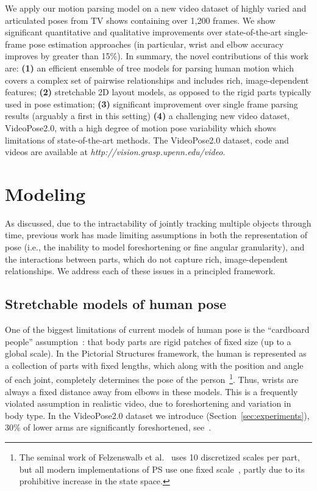 We apply our motion parsing model on a new video dataset of highly varied and 
articulated poses from TV shows containing over 1,200 frames.  We show 
significant quantitative and qualitative improvements over state-of-the-art 
single-frame pose estimation approaches (in particular, wrist and elbow 
accuracy improves by greater than 15\%).  In summary, the novel contributions 
of this work are: \textbf{(1)} an efficient ensemble of tree models for parsing 
human motion which covers a complex set of pairwise relationships and includes 
rich, image-dependent features; \textbf{(2)} stretchable 2D layout models, as 
opposed to the rigid parts typically used in pose estimation;
\textbf{(3)} significant improvement over single frame parsing results 
(arguably a first in this setting) \textbf{(4)} a challenging new video dataset, VideoPose2.0, 
with a high degree of motion pose variability which shows limitations of 
state-of-the-art methods.  The VideoPose2.0 dataset, code and videos are available at 
\textit{http://vision.grasp.upenn.edu/video}.



\section{Modeling}\label{sec:model}
As discussed, due to the intractability of jointly tracking multiple objects through time, previous 
work has made limiting assumptions in both the representation of pose (i.e., 
the inability to model foreshortening or fine angular granularity), and the 
interactions between parts, which do not capture rich, image-dependent 
relationships.  We address each of these issues in a principled framework.

\subsection{Stretchable models of human pose}  One of the biggest limitations 
of current models of human pose is the ``cardboard people'' 
assumption~\cite{cardboard02}: that body parts are rigid patches of fixed size 
(up to a global scale).  In the Pictorial Structures framework, the human is 
represented as a collection of parts with fixed lengths, which along with the 
position and angle of each joint, completely determines the pose of the 
person~\footnote{The seminal work of Felzenswalb et al.~\cite{felz05} uses 10 
discretized scales per part, but all modern implementations of PS use one fixed 
scale~\cite{sapp2010cascades,ferrari08,andriluka09}, partly due to its 
prohibitive increase in the state space.}.  Thus, wrists are always a fixed 
distance away from elbows in these models. This is a frequently violated 
assumption in realistic video, due to foreshortening and variation in body 
type.  In the VideoPose2.0 dataset we  introduce 
(Section~\ref{sec:experiments}), 30\% of lower arms are significantly 
foreshortened, see~.

